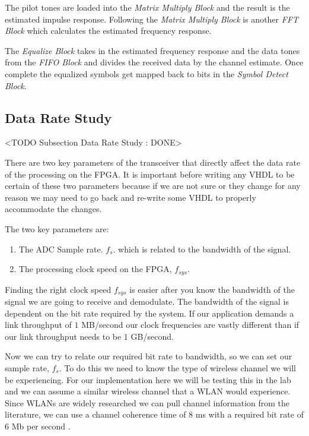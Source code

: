 The pilot tones are loaded into the \emph{Matrix Multiply Block} and the result is the estimated impulse response. Following the \emph{Matrix Multiply Block} is another \emph{FFT Block} which calculates the estimated frequency response.

The \emph{Equalize Block} takes in the estimated frequency response and the data tones from the \emph{\ac{FIFO} Block} and divides the received data by the channel estimate. Once complete the equalized symbols get mapped back to bits in the \emph{Symbol Detect Block}.

\subsection{Data Rate Study}
 <TODO Subsection Data Rate Study : DONE>
 
There are two key parameters of the transceiver that directly affect the data rate of the processing on the \ac{FPGA}. It is important before writing any \ac{VHDL} to be certain of these two parameters because if we are not sure or they change for any reason we may need to go back and re-write some \ac{VHDL} to properly accommodate the changes.

The two key parameters are:
\begin{enumerate}
\item{The \ac{ADC} Sample rate. $f_s$. which is related to the bandwidth of the signal.}
\item{The processing clock speed on the \ac{FPGA}, $f_{sys}$.}
\end{enumerate}
 
Finding the right clock speed $f_{sys}$ is easier after you know the bandwidth of the signal we are going to receive and demodulate. The bandwidth of the signal is dependent on the bit rate required by the system. If our application demands a link throughput of $1$ \ac{MB}/second our clock frequencies are vastly different than if our link throughput needs to be $1$ \ac{GB}/second.

Now we can try to relate our required bit rate to bandwidth, so we can set our sample rate, $f_s$. To do this we need to know the type of wireless channel we will be experiencing. For our implementation here we will be testing this in the lab and we can assume a similar wireless channel that a \ac{WLAN} would experience. Since \ac{WLAN}s are widely researched we can pull channel information from the literature, we can use a channel coherence time of $8$ \ac{ms} with a required bit rate of $6$ \ac{Mb} per second \cite{jung2011react}.

